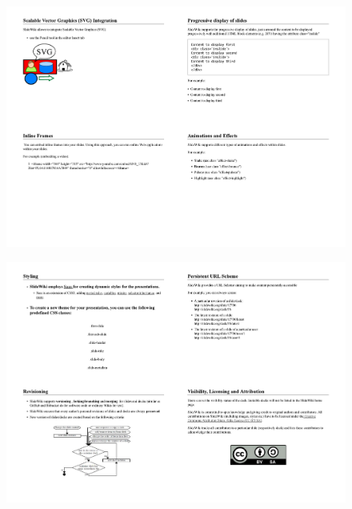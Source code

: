 \begin{figure}
    \centering
    \includegraphics[width=\columnwidth]{images/page2.pdf}
    
\end{figure}

\begin{figure}
    \centering
    \includegraphics[width=\columnwidth]{images/page3.pdf}
    
\end{figure}

